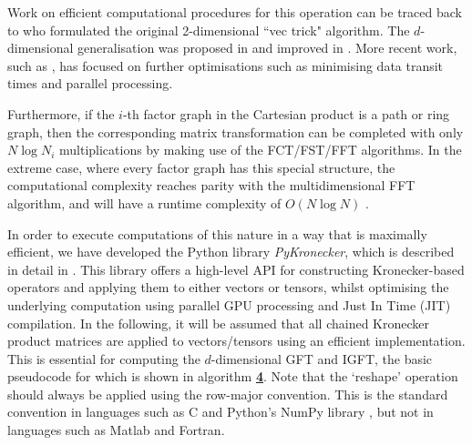 Work on efficient computational procedures for this operation can be traced back to \cite{Roth1934} who formulated the original 2-dimensional ``vec trick" algorithm. The $d$-dimensional generalisation was proposed in \cite{Pereyra1973} and improved in \cite{DeBoor1979}. More recent work, such as \cite{Fackler2019}, has focused on further optimisations such as minimising data transit times and parallel processing. 

Furthermore, if the $i$-th factor graph in the Cartesian product is a path or ring graph, then the corresponding matrix transformation can be completed with only $N \log N_i$ multiplications by making use of the FCT/FST/FFT algorithms. In the extreme case, where every factor graph has this special structure, the computational complexity reaches parity with the multidimensional FFT algorithm, and will have a runtime complexity of $O(N \log N)$ \citep{Smith1995}. 

In order to execute computations of this nature in a way that is maximally efficient, we have developed the Python library \textit{PyKronecker}, which is described in detail in \cite{Antonian2023}. This library offers a high-level API for constructing Kronecker-based operators and applying them to either vectors or tensors, whilst optimising the underlying computation using parallel GPU processing and Just In Time (JIT) compilation. In the following, it will be assumed that all chained Kronecker product matrices are applied to vectors/tensors using an efficient implementation. This is essential for computing the $d$-dimensional GFT and IGFT, the basic pseudocode for which is shown in algorithm \hyperlink{al:GFT_dd}{\textbf{4}}. Note that the `reshape' operation should always be applied using the row-major convention. This is the standard convention in languages such as C and Python's NumPy library \citep{Harris2020}, but not in languages such as Matlab and Fortran. 

